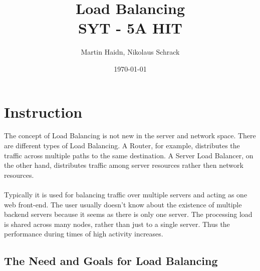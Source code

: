 \documentclass[12p]{article}
\author{Martin Haidn, Nikolaus Schrack}
\title{\Huge{Load Balancing}\\\Large{SYT - 5A HIT}}
\date{\today}
\begin{document}
	\maketitle
	
	\newpage
	\tableofcontents
	
	\newpage
	\section{Instruction}
	
	The concept of Load Balancing is not new in the server and network space. There are different types of Load Balancing. A Router, for example, distributes the traffic across multiple paths to the same destination. A Server Load Balancer, on the other hand, distributes traffic among server resources rather then network resources. \cite{lb_SFC}  \\ \\
	Typically it is used for balancing traffic over multiple servers and acting as one web front-end. The user usually doesn't know about the existence of multiple backend servers because it seems as there is only one server. The processing load is shared across many nodes, rather than just to a single server. Thus the performance during times of high activity increases.
	\cite{liquidweb}
	
	
	\subsection{The Need and Goals for Load Balancing}
	
\end{document}

